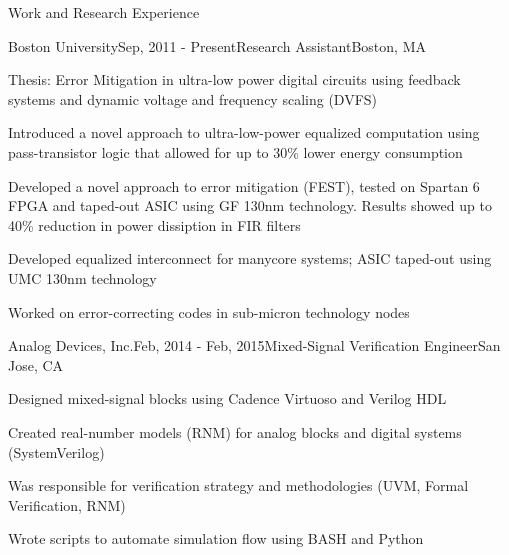 \begin{rSection} {Work and Research Experience}
    \begin{rSubsection}{Boston University}{Sep, 2011 - Present}{Research Assistant}{Boston, MA}
    \item Thesis: Error Mitigation in ultra-low power digital circuits using feedback systems and dynamic voltage and frequency scaling (DVFS)
    \item Introduced a novel approach to ultra-low-power equalized computation using pass-transistor logic that allowed for up to 30\% lower energy consumption
    \item Developed a novel approach to error mitigation (FEST), tested on Spartan 6 FPGA and taped-out ASIC using GF 130nm technology. Results showed up to 40\% reduction in power dissiption in FIR filters
    \item Developed equalized interconnect for manycore systems; ASIC taped-out using UMC 130nm technology
    \item Worked on error-correcting codes in sub-micron technology nodes
  \end{rSubsection}
  \begin{rSubsection}{Analog Devices, Inc.}{Feb, 2014 - Feb, 2015}{Mixed-Signal Verification Engineer}{San Jose, CA}
  \item Designed mixed-signal blocks using Cadence Virtuoso and Verilog HDL
  \item Created real-number models (RNM) for analog blocks and digital systems (SystemVerilog)
  \item Was responsible for verification strategy and methodologies (UVM, Formal Verification, RNM)
  \item Wrote scripts to automate simulation flow using BASH and Python
  \end{rSubsection}

\end{rSection}
